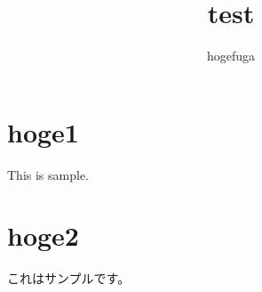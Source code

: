 \documentclass[dvipdfmx]{jreport}
\begin{document}
\title{test}
\author{hogefuga}

\maketitle

\section{hoge1}

This is sample.

\section{hoge2}

これはサンプルです。
\end{document}
